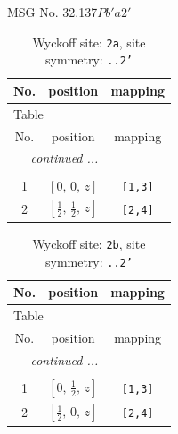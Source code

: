 \documentclass[fleqn,8pt]{jsarticle}
\begin{document}
\setcounter{MaxMatrixCols}{32}

\renewcommand{\tablename}{Table~}
\renewcommand{\figurename}{Figure~}
\begin{center}
\LARGE
MSG No. 32.137\quad$Pb'a2'$
\end{center}
\renewcommand{\arraystretch}{1.2}
\begin{longtable}{ccc}
\caption{Wyckoff site: {\tt 2a}, site symmetry: {\tt ..2'}}
 \\
 \hline \hline
No. & position & mapping \\ \hline \endfirsthead

\multicolumn{2}{l}{\tablename\ \thetable{}} \\
 \hline \hline
No. & position & mapping \\ \hline \endhead

 \hline \hline
\multicolumn{2}{r}{\footnotesize\it continued ...} \\ \endfoot

 \hline \hline
\multicolumn{2}{r}{} \\ \endlastfoot

1 & $\left[ 0,\, 0,\, z \right]$ & {\tt [1,3]} \\ \hline
2 & $\left[ \frac{1}{2},\, \frac{1}{2},\, z \right]$ & {\tt [2,4]} \\
\end{longtable}
\renewcommand{\arraystretch}{1.2}
\begin{longtable}{ccc}
\caption{Wyckoff site: {\tt 2b}, site symmetry: {\tt ..2'}}
 \\
 \hline \hline
No. & position & mapping \\ \hline \endfirsthead

\multicolumn{2}{l}{\tablename\ \thetable{}} \\
 \hline \hline
No. & position & mapping \\ \hline \endhead

 \hline \hline
\multicolumn{2}{r}{\footnotesize\it continued ...} \\ \endfoot

 \hline \hline
\multicolumn{2}{r}{} \\ \endlastfoot

1 & $\left[ 0,\, \frac{1}{2},\, z \right]$ & {\tt [1,3]} \\ \hline
2 & $\left[ \frac{1}{2},\, 0,\, z \right]$ & {\tt [2,4]} \\
\end{longtable}
\renewcommand{\arraystretch}{1.2}
\end{document}

